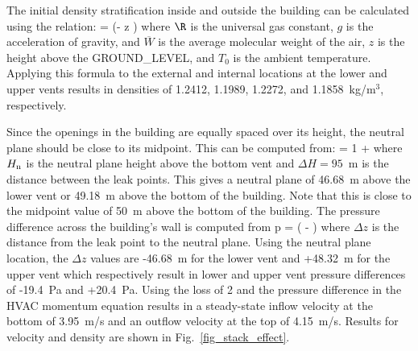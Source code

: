 \documentclass[11pt]{book}
\begin{document}
The initial density stratification inside and outside the building can be calculated using the relation:
\be
   = \exp \left(-  z \right)
\ee
where $\R$ is the universal gas constant, $g$ is the acceleration of gravity, and $\overline{W}$ is the average molecular weight of the air, $z$ is the height above the {\ct GROUND\_LEVEL}, and $T_0$ is the ambient temperature. Applying this formula to the external and internal locations at the lower and upper vents results in densities of 1.2412, 1.1989, 1.2272, and 1.1858~kg/m$^3$, respectively.

Since the openings in the building are equally spaced over its height, the neutral plane should be close to its midpoint. This can be computed from:
\be
   = 1 + 
\ee
where $H_{\rm n}$ is the neutral plane height above the bottom vent and $\Delta H=95$~m is the distance between the leak points. This gives a neutral plane of 46.68~m above the lower vent or 49.18~m above the bottom of the building. Note that this is close to the midpoint value of 50~m above the bottom of the building. The pressure difference across the building's wall is computed from
\be
   \Delta p =  \R \left(  -  \right)
\ee
where $ \Delta z$ is the distance from the leak point to the neutral plane.  Using the neutral plane location, the $ \Delta z$ values are -46.68~m for the lower vent and +48.32~m for the upper vent which respectively result in lower and upper vent pressure differences of -19.4~Pa and +20.4~Pa.  Using the loss of 2 and the pressure difference in the HVAC momentum equation results in a steady-state inflow velocity at the bottom of 3.95~m/s and an outflow velocity at the top of 4.15~m/s. Results for velocity and density are shown in Fig.~\ref{fig_stack_effect}.
\end{document}
